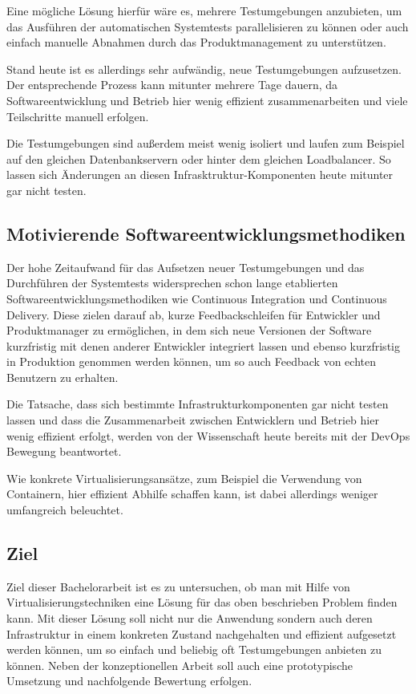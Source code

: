 Eine mögliche Lösung hierfür wäre es, mehrere Testumgebungen anzubieten, um das Ausführen der automatischen Systemtests parallelisieren zu können oder auch einfach manuelle Abnahmen durch das Produktmanagement zu unterstützen.

Stand heute ist es allerdings sehr aufwändig, neue Testumgebungen aufzusetzen. Der entsprechende Prozess kann mitunter mehrere Tage dauern, da Softwareentwicklung und Betrieb hier wenig effizient zusammenarbeiten und viele Teilschritte manuell erfolgen.

Die Testumgebungen sind außerdem meist wenig isoliert und laufen zum Beispiel auf den gleichen Datenbankservern oder hinter dem gleichen Loadbalancer. So lassen sich Änderungen an diesen Infrasktruktur-Komponenten heute mitunter gar nicht testen.

\subsection{Motivierende Softwareentwicklungsmethodiken}

Der hohe Zeitaufwand für das Aufsetzen neuer Testumgebungen und das Durchführen der Systemtests widersprechen schon lange etablierten Softwareentwicklungsmethodiken wie Continuous Integration und Continuous Delivery. Diese zielen darauf ab, kurze Feedbackschleifen für Entwickler und Produktmanager zu ermöglichen, in dem sich neue Versionen der Software kurzfristig mit denen anderer Entwickler integriert lassen und ebenso kurzfristig in Produktion genommen werden können, um so auch Feedback von echten Benutzern zu erhalten.

Die Tatsache, dass sich bestimmte Infrastrukturkomponenten gar nicht testen lassen und dass die Zusammenarbeit zwischen Entwicklern und Betrieb hier wenig effizient erfolgt, werden von der Wissenschaft heute bereits mit der DevOps Bewegung beantwortet.

Wie konkrete Virtualisierungsansätze, zum Beispiel die Verwendung von Containern, hier effizient Abhilfe schaffen kann, ist dabei allerdings weniger umfangreich beleuchtet.

\subsection{Ziel}

Ziel dieser Bachelorarbeit ist es zu untersuchen, ob man mit Hilfe von Virtualisierungstechniken eine Lösung für das oben beschrieben Problem finden kann. Mit dieser Lösung soll nicht nur die Anwendung sondern auch deren Infrastruktur in einem konkreten Zustand nachgehalten und effizient aufgesetzt werden können, um so einfach und beliebig oft Testumgebungen anbieten zu können. Neben der konzeptionellen Arbeit soll auch eine prototypische Umsetzung und nachfolgende Bewertung erfolgen.


